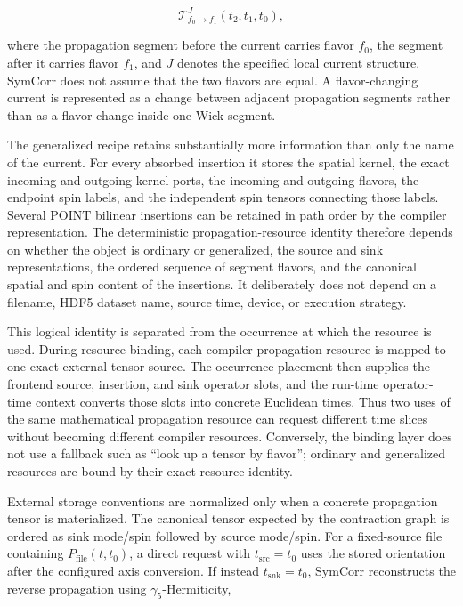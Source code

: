 \documentclass[11pt]{article}
\begin{document}
\begin{equation}
\mathcal T_{f_0\to f_1}^{J}
(t_2,t_1,t_0),
\label{eq:generalized_propagation_schematic}
\end{equation}

where the propagation segment before the current carries flavor \(f_0\), the
segment after it carries flavor \(f_1\), and \(J\) denotes the specified local
current structure. SymCorr does not assume that the two flavors are equal. A
flavor-changing current is represented as a change between adjacent propagation
segments rather than as a flavor change inside one Wick segment.

The generalized recipe retains substantially more information than only the
name of the current. For every absorbed insertion it stores the spatial kernel,
the exact incoming and outgoing kernel ports, the incoming and outgoing
flavors, the endpoint spin labels, and the independent spin tensors connecting
those labels. Several POINT bilinear insertions can be retained in path order by
the compiler representation. The deterministic propagation-resource identity
therefore depends on whether the object is ordinary or generalized, the source
and sink representations, the ordered sequence of segment flavors, and the
canonical spatial and spin content of the insertions. It deliberately does not
depend on a filename, HDF5 dataset name, source time, device, or execution
strategy.

This logical identity is separated from the occurrence at which the resource is
used. During resource binding, each compiler propagation resource is mapped to
one exact external tensor source. The occurrence placement then supplies the
frontend source, insertion, and sink operator slots, and the run-time
operator-time context converts those slots into concrete Euclidean times. Thus
two uses of the same mathematical propagation resource can request different
time slices without becoming different compiler resources. Conversely, the
binding layer does not use a fallback such as ``look up a tensor by flavor'';
ordinary and generalized resources are bound by their exact resource identity.

External storage conventions are normalized only when a concrete propagation
tensor is materialized. The canonical tensor expected by the contraction graph
is ordered as sink mode/spin followed by source mode/spin. For a fixed-source
file containing
\(P_{\mathrm{file}}(t,t_0)\), a direct request with
\(t_{\mathrm{src}}=t_0\) uses the stored orientation after the configured axis
conversion. If instead \(t_{\mathrm{snk}}=t_0\), SymCorr reconstructs the
reverse propagation using \(\gamma_5\)-Hermiticity,
\end{document}
